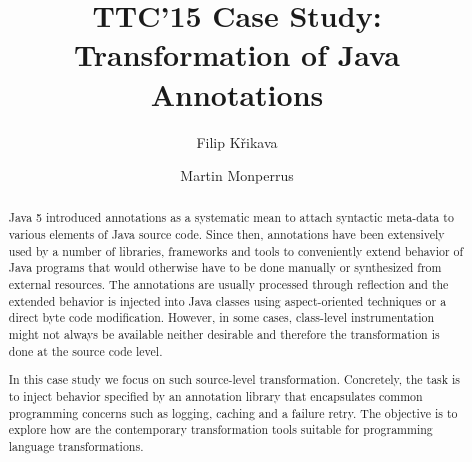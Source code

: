 \documentclass[submission]{eptcs}
\title{TTC'15 Case Study: Transformation of Java Annotations}
\author{
  Filip Křikava
  \institute{INRIA Lille}
  \institute{France}
  \email{\href{mailto:filip.krikava@inria.fr}{filip.krikava@inria.fr}}
\and
  Martin Monperrus
  \institute{University Lille 1 / INRIA Lille}
  \institute{France}
  \email{\href{mailto:martin.monperrus@univ-lille1.fr}{martin.monperrus@univ-lille1.fr}}
}
\begin{document}
\maketitle

\begin{abstract}

Java 5 introduced annotations as a systematic mean to attach syntactic meta-data to various elements of Java source code.
Since then, annotations have been extensively used by a number of libraries, frameworks and tools to conveniently extend behavior of Java programs that would otherwise have to be done manually or synthesized from external resources.
The annotations are usually processed through reflection and the extended behavior is injected into Java classes using aspect-oriented techniques or a direct byte code modification.
However, in some cases, class-level instrumentation might not always be available neither desirable and therefore the transformation is done at the source code level.

In this case study we focus on such source-level transformation.
Concretely, the task is to inject behavior specified by an annotation library that encapsulates common programming concerns such as logging, caching and a failure retry.
The objective is to explore how are the contemporary transformation tools suitable for programming language transformations.
\end{abstract}






	

\newpage 
\appendix


\end{document}
